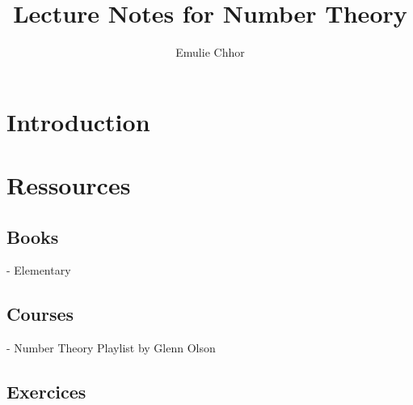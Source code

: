 \documentclass{article}
\begin{document}
\title{Lecture Notes for Number Theory}
\author{Emulie Chhor}
\maketitle

\section*{Introduction}

\newtheorem{definition}{Definition}[subsection]
\newtheorem{theorem}{Theorem}[subsection]
\newtheorem{corollary}{Corollary}[subsection]
\newtheorem{lemma}[theorem]{Lemma}
\newtheorem{proposition}{Proposition}[section]
\newtheorem{axiom}{Axiome}
\newtheorem{property}{Propriété}[subsection]
\newtheorem*{remark}{Remarque}
\newtheorem*{problem}{Problème}
\newtheorem*{intuition}{Intuition}

\section{Ressources}%
\label{sec:Ressources}

\subsection{Books}%
\label{sub:Books}

- Elementary

\subsection{Courses}%
\label{sub:Courses}

- Number Theory Playlist by Glenn Olson

\subsection{Exercices}%
\label{sub:Exercices}
\end{document}
